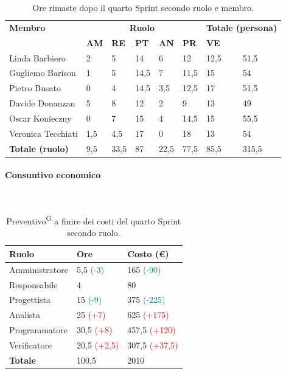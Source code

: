 \documentclass[8pt]{article}
\newcommand{\glossterm}[1]{#1\textsuperscript{G}} %
\newcommand{\subsubsubsection}[1]{\paragraph{#1}\mbox{}\\}
\begin{document}
\begin{table}[ht!]
	\centering
	\begin{tabular}{p{3cm} p{1.4cm} p{1.6cm} p{1.5cm} p{1.5cm} p{1.5cm} p{1.5cm} p{2cm}}
		\toprule
        \textbf{Membro} & \multicolumn{5}{c}{\textbf{Ruolo}} & \multicolumn{2}{r}{\textbf{Totale (persona)}}\\
		& \textbf{AM} & \textbf{RE} & \textbf{PT} & \textbf{AN} & \textbf{PR} & \textbf{VE}\\
		\midrule
        Linda Barbiero     & 2 & 5 & 14 & 6 & 12 & 12,5 & 51,5 \\
        Gugliemo Barison   & 1 & 5 & 14,5 & 7 & 11,5 & 15 & 54 \\
        Pietro Busato      & 0 & 4 & 14,5 & 3,5 & 12,5 & 17 & 51,5 \\
        Davide Donanzan    & 5 & 8 & 12 & 2 & 9 & 13 & 49 \\
        Oscar Konieczny    & 0 & 7 & 15 & 4 & 14,5 & 15 & 55,5 \\
        Veronica Tecchiati & 1,5 & 4,5 & 17 & 0 & 18 & 13 & 54 \\
        \midrule
        \textbf{Totale (ruolo)} & 9,5 & 33,5 & 87 & 22,5 & 77,5 & 85,5 & 315,5 \\
		\bottomrule
	\end{tabular}
	\caption{Ore rimaste dopo il quarto Sprint secondo ruolo e membro.}
	\label{table:Ore rimaste dopo il quarto Sprint secondo ruolo e membro.}
\end{table}
\subsubsubsection{Consuntivo economico}
\begin{table}[ht!]
    \centering
    \begin{tabular}{p{4cm} p{1.8cm} p{2.2cm}}
        \toprule
        \textbf{Ruolo} & \textbf{Ore} & \textbf{Costo (€)} \\
        \midrule
        Amministratore & 5,5 \textcolor{teal}{(-3)} & 165 \textcolor{teal}{(-90)} \\
        Responsabile & 4  & 80 \\
        Progettista & 15 \textcolor{teal}{(-9)}  & 375 \textcolor{teal}{(-225)} \\
        Analista & 25 \textcolor{red}{(+7)} & 625 \textcolor{red}{(+175)} \\
        Programmatore & 30,5 \textcolor{red}{(+8)} & 457,5 \textcolor{red}{(+120)} \\
        Verificatore & 20,5 \textcolor{red}{(+2,5)} & 307,5 \textcolor{red}{(+37,5)} \\
        \bottomrule
        \textbf{Totale} & 100,5 & 2010
    \end{tabular}
    \caption{\glossterm{Preventivo} a finire dei costi del quarto Sprint secondo ruolo.}
    \label{table:Preventivo a finire dei costi del quartoo Sprint secondo ruolo}
\end{table}
\end{document}

